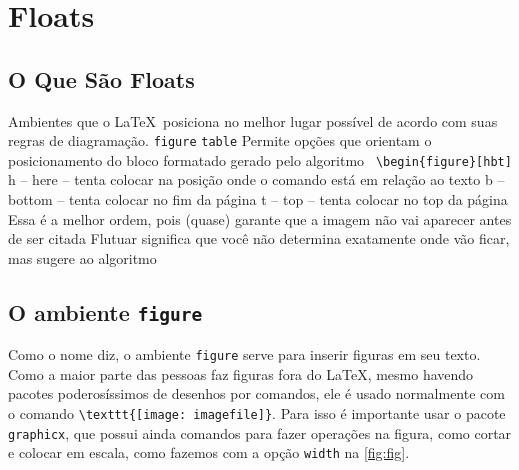 \section{Floats}
\subsection{O Que São Floats}

    \begin{outline}
        \1 Ambientes que o \LaTeX\ posiciona no melhor lugar possível de acordo com suas regras de diagramação.
        \2 \lstinline|figure|
        \2 \lstinline|table|
        \1 Permite opções que orientam o posicionamento do bloco formatado gerado pelo algoritmo
        \2\lstinline| \begin{figure}[hbt]|
        \3 h -- here -- tenta colocar na posição onde o comando está em relação ao texto
        \3 b -- bottom -- tenta colocar no fim da página
        \3 t -- top -- tenta colocar no top da página
        \2 Essa é a melhor ordem, pois (quase) garante que a imagem não vai aparecer antes de ser citada
        \1 Flutuar significa que você não determina exatamente onde vão ficar, mas sugere ao algoritmo 
    \end{outline}


\subsection{O ambiente \lstinline|figure|}

Como o nome diz, o ambiente \lstinline|figure| serve para inserir figuras em seu texto. Como a maior parte das pessoas faz figuras fora do \LaTeX, mesmo havendo pacotes poderosíssimos de desenhos por comandos, ele é usado normalmente com o comando
\lstinline|\texttt{[image: imagefile]}|. Para isso é importante usar o pacote \lstinline|graphicx|, que possui ainda comandos para fazer operações na figura, como cortar e colocar em escala, como fazemos com a opção \lstinline|width| na \ref{fig:fig}.


